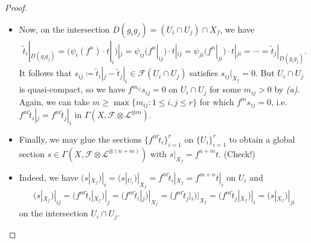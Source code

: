 \documentclass[11pt,a4paper,footinclude=true,headinclude=true]{scrbook} %
\newcommand{\FF}{\mathscr{F}}
\newcommand{\LL}{\mathscr{L}}
\newcommand{\OO}{\mathcal{O}}
\newcommand{\<}{\langle}
\newcommand{\>}{\rangle}
\begin{document}
\begin{proof}
\begin{itemize}
\begin{itemize}
            \begin{align*}
                \FF\otimes\LL^{\otimes n}|_{U_i}\xrightarrow[\sim]{\mathds{1}_\FF\times\psi_i}\FF\otimes\OO_{U_i}^{\otimes n}\simeq\FF\otimes\OO_{U_i}^{\otimes n_i}\simeq\FF|_{U_i},
            \end{align*}
            whence $\tilde{t}_i|_{X_f}=g_i^nt|_i=\psi_i(f^n|_i)\cdot t|_i$ in $\Gamma(D(g_i),\FF\otimes\OO_{U_i}^{\otimes n})$
            \item Now, on the intersection $D(g_ig_j)=(U_i\cap U_j)\cap X_f$, we have
            \begin{align*}
                \tilde{t}_i|_{D(g_ig_j)}=(\psi_i(f^n)\cdot t|_i)|_j=\psi_{ij}(f^n|_{ij})\cdot t|_{ij}=\psi_{ji}(f^n|_{ji})\cdot t|_{ji}=\cdots=\tilde{t}_j|_{D(g_ig_j)}.
            \end{align*}
            It follows that $s_{ij}\coloneqq\tilde{t}_i|_j-\tilde{t}_j|_i\in\FF(U_i\cap U_j)$ satisfies $s_{ij}|_{X_f}=0$. But $U_i\cap U_j$ is quasi-compact, so we have $f^{m_{ij}}s_{ij}=0$ on $U_i\cap U_j$ for some $m_{ij}>0$ by \textit{(a)}. Again, we can take $m\geq\max\{m_{ij}:1\leq i,j\leq r\}$ for which $f^ms_{ij}=0$, i.e. $f^m\tilde{t}_i|_j=f^m\tilde{t}_j|_i$ in $\Gamma(X,\FF\otimes\LL^{\otimes m})$.
            \item Finally, we may glue the sections $\{f^m\tilde{t}_i\}_{i=1}^r$ on $\{U_i\}_{i=1}^r$ to obtain a global section $s\in\Gamma(X,\FF\otimes\LL^{\otimes (n+m)})$ with $s|_{X_f}=f^{n+m}t$. (Check!)
            \item Indeed, we have $(s|_{X_f})|_i=(s|_{U_i})|_{X_f}=f^m\tilde{t}_i|_{X_f}=f^{m+n}t|_i$ on $U_i$ and 
            \begin{align*}
                (s|_{X_f})|_{ij}=(f^m\tilde{t}_i|_{X_f})|_j=(f^m\tilde{t}_i|_j)|_{X_f}=(f^m\tilde{t}_j|_i)|_{X_f}=(f^m\tilde{t}_j|_{X_f})|_i=(s|_{X_f})|_{ji}
            \end{align*}
            on the intersection $U_i\cap U_j$.
        \end{itemize}
    \end{itemize}
\end{proof}
\end{document}
